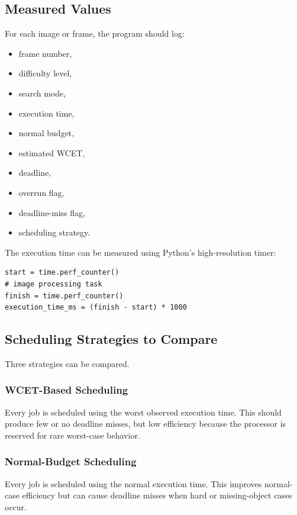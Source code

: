 \documentclass[conference]{IEEEtran}
\begin{document}
\subsection{Measured Values}

For each image or frame, the program should log:

\begin{itemize}
    \item frame number,
    \item difficulty level,
    \item search mode,
    \item execution time,
    \item normal budget,
    \item estimated WCET,
    \item deadline,
    \item overrun flag,
    \item deadline-miss flag,
    \item scheduling strategy.
\end{itemize}

The execution time can be measured using Python's high-resolution timer:

\begin{lstlisting}
start = time.perf_counter()
# image processing task
finish = time.perf_counter()
execution_time_ms = (finish - start) * 1000
\end{lstlisting}

\subsection{Scheduling Strategies to Compare}

Three strategies can be compared.

\subsubsection{WCET-Based Scheduling}

Every job is scheduled using the worst observed execution time. This should produce few or no deadline misses, but low efficiency because the processor is reserved for rare worst-case behavior.

\subsubsection{Normal-Budget Scheduling}

Every job is scheduled using the normal execution time. This improves normal-case efficiency but can cause deadline misses when hard or missing-object cases occur.
\end{document}
